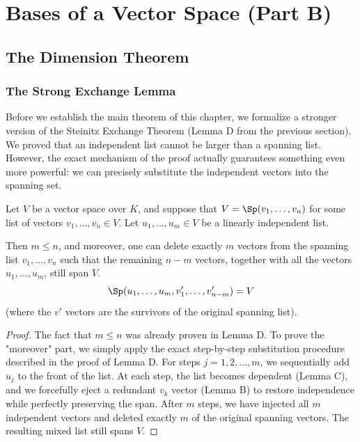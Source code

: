 \setcounter{chapter}{9}
\renewcommand{\thetheorem}{10.b.\arabic{theorem}}
\setcounter{theorem}{0}

\chapter{Bases of a Vector Space (Part B)}
\section{The Dimension Theorem}

\subsection{The Strong Exchange Lemma}

Before we establish the main theorem of this chapter, we formalize a stronger version of the Steinitz Exchange Theorem (Lemma D from the previous section). We proved that an independent list cannot be larger than a spanning list. However, the exact mechanism of the proof actually guarantees something even more powerful: we can precisely substitute the independent vectors into the spanning set.

\begin{lemma}
Let $V$ be a vector space over $K$, and suppose that $V = \Sp(v_1, \dots, v_n)$ for some list of vectors $v_1, \dots, v_n \in V$. Let $u_1, \dots, u_m \in V$ be a linearly independent list. 

Then $m \le n$, and moreover, one can delete exactly $m$ vectors from the spanning list $v_1, \dots, v_n$ such that the remaining $n-m$ vectors, together with all the vectors $u_1, \dots, u_m$, still span $V$.
\[
\Sp(u_1, \dots, u_m, v'_1, \dots, v'_{n-m}) = V
\]
(where the $v'$ vectors are the survivors of the original spanning list).
\end{lemma}

\begin{proof}
The fact that $m \le n$ was already proven in Lemma D. To prove the "moreover" part, we simply apply the exact step-by-step substitution procedure described in the proof of Lemma D. 
For steps $j = 1, 2, \dots, m$, we sequentially add $u_j$ to the front of the list. At each step, the list becomes dependent (Lemma C), and we forcefully eject a redundant $v_k$ vector (Lemma B) to restore independence while perfectly preserving the span. After $m$ steps, we have injected all $m$ independent vectors and deleted exactly $m$ of the original spanning vectors. The resulting mixed list still spans $V$.
\end{proof}

